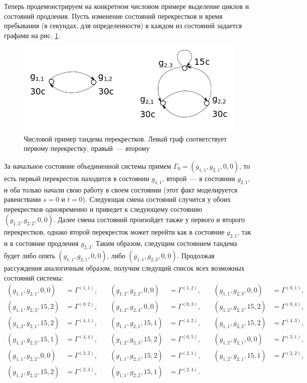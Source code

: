 Теперь продемонстрируем на конкретном числовом примере выделение циклов и состояний продления. Пусть изменение состояний перекрестков и время пребывания (в секундах,  для определенности) в каждом из состояний задается графами на рис. \ref{SystemStates}.
\begin{figure}[h]\centering
\includegraphics[scale=0.5]{Pictures/SystemStates.png} 
\caption{Числовой пример тандема перекрестков. Левый граф соответствует первому перекрестку,  правый~--- второму}
\label{SystemStates}
\end{figure}
За начальное состояние объединенной системы примем $\Gamma_0=(g_{1,  1},  g_{2,  1},  0,  0)$,  то есть первый перекресток находится в состоянии $g_{1, 1}$,  второй~--- в состоянии $g_{2,  1}$,  и оба только начали свою работу в своем состоянии (этот факт моделируется равенствами $s=0$ и $t=0$). Следующая смена состояний случится у обоих перекрестков одновременно и приведет к следующему состоянию $(g_{1,  2},  g_{2,  2},  0,  0)$. Далее смена состояний произойдет также у первого и второго перекрестков,  однако второй перекресток может перейти как в состояние $g_{2,  1}$,  так и в состояние продления $g_{2,  3}$. Таким образом,  следущим состоянием тандема будет либо опять $(g_{1,  1},  g_{2,  1},  0,  0)$,  либо $(g_{1,  1},  g_{2,  3},  0,  0)$. Продолжая рассуждения аналогичным образом,  получим следущий список всех возможных состояний системы:
\begin{align*}
(g_{1,  1},  g_{2,  1},  0,  0)&=\Gamma^{(1,  1)} ,  & \quad (g_{1,  2},  g_{2,  2},  0,  0)&=\Gamma^{(1,  2)} ,  & \quad (g_{1,  1},  g_{2,  3},  0,  0)&=\Gamma^{(0,  1)},   \\
(g_{1,  1},  g_{2,  3},  15,  2)&=\Gamma^{(0,  2)} ,  & \quad (g_{1,  2},  g_{2,  3},  0,  0)&=\Gamma^{(0,  3)} ,  & \quad (g_{1,  2},  g_{2,  3},  15,  2)&=\Gamma^{(0,  4)},   \\
(g_{1,  2},  g_{2,  1},  15,  2)&=\Gamma^{(4,  1)} ,  & \quad (g_{1,  1},  g_{2,  1},  15,  1)&=\Gamma^{(4,  2)} ,  & \quad (g_{1,  1},  g_{2,  2},  15,  2)&=\Gamma^{(4,  3)},   \\
(g_{1,  2},  g_{2,  2},  15,  1)&=\Gamma^{(4,  4)} ,  & \quad (g_{1,  2},  g_{2,  3},  15,  2)&=\Gamma^{(0,  5)} ,  & \quad (g_{1,  2},  g_{2,  1},  0,  0)&=\Gamma^{(3,  1)},   \\
(g_{1,  1},  g_{2,  2},  0,  0)&=\Gamma^{(3,  2)} ,  & \quad (g_{1,   1},  g_{2,  1},  15,  2)&=\Gamma^{(2,  1)} ,  & \quad (g_{1,  2},  g_{2,  1},  15,  1)&=\Gamma^{(2,  2)},   \\
(g_{1,  2},  g_{2,  2},  15,  2)&=\Gamma^{(2,  3)} ,  & \quad (g_{1,  1},  g_{2,  2},  15,  1)&=\Gamma^{(2,  4)}. & &
\end{align*}
